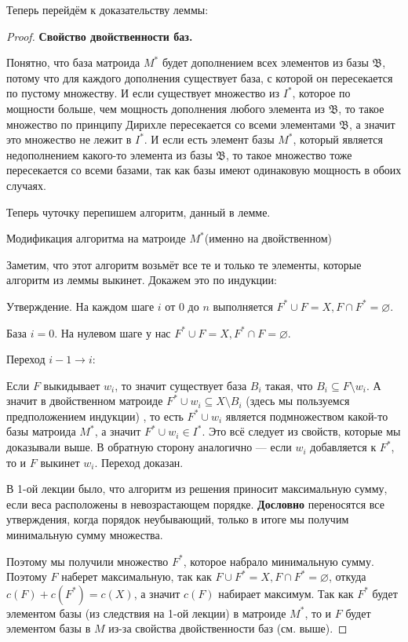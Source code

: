 \documentclass[a4paper, 12pt]{article}
\begin{document}
Теперь перейдём к доказательству леммы:

\begin{proof}

{\bf Свойство двойственности баз.}

Понятно, что база матроида $M^*$ будет дополнением всех элементов из базы $\mathfrak{B}$,
потому что для каждого дополнения существует база, с которой он пересекается по
пустому множеству. И если существует множество из $I^*$, которое по мощности
больше, чем мощность дополнения любого элемента из $\mathfrak{B}$, то такое
множество по принципу Дирихле пересекается со всеми элементами $\mathfrak{B}$,
а значит это множество не лежит в $I^*$. И если есть элемент базы $M^*$, который является недополнением
какого-то
элемента из базы $\mathfrak{B}$, то такое множество тоже пересекается со всеми
базами, так как базы имеют одинаковую мощность в обоих случаях.

Теперь чуточку перепишем алгоритм, данный в лемме.

\begin{algorithm}
  \caption{Модификация алгоритма на матроиде $M^*$(именно на двойственном)}
    \begin{algorithmic}[1]
        \EndIf
      \EndFor
    \end{algorithmic}
\end{algorithm}

Заметим, что этот алгоритм возьмёт все те и только те элементы, которые алгоритм
из леммы выкинет. Докажем это по индукции:

Утверждение. На каждом шаге $i$ от 0 до $n$ выполняется $F^* \cup F = X, F \cap
F^* = \varnothing$.

База $i = 0$. На нулевом шаге у нас $F^* \cup F = X, F^* \cap F = \varnothing$.

Переход $i - 1 \to i$:

Если $F$ выкидывает $w_i$, то значит существует база $B_i$ такая, что $B_i
\subseteq F \setminus w_i$. А значит в двойственном матроиде $F^* \cup w_i \subseteq
X \setminus B_i$ (здесь мы пользуемся предположением индукции) , то есть $F^* 
\cup w_i$ является подмножеством какой-то базы 
матроида $M^*$, а значит $F^* \cup w_i \in I^*$. Это всё следует из свойств,
которые мы доказывали выше. В обратную сторону аналогично --- если $w_i$ добавляется
к $F^*$, то и $F$ выкинет $w_i$. Переход доказан.

В 1-ой лекции было, что алгоритм из решения приносит максимальную сумму, если веса
расположены в невозрастающем порядке. {\bf Дословно} переносятся все утверждения,
когда порядок неубывающий, только в итоге мы получим минимальную сумму множества.

Поэтому мы получили множество $F^*$, которое набрало минимальную сумму. Поэтому
$F$ наберет максимальную, так как $F \cup F^* = X, F \cap F^* = \varnothing$, откуда
$c(F) + c(F^*) = c(X)$, а значит $c(F)$ набирает максимум. Так как $F^*$
будет элементом базы (из следствия на 1-ой лекции) в матроиде $M^*$, то и $F$ будет
элементом базы в $M$ из-за
свойства двойственности баз (см. выше).
\end{proof}
\end{document}
